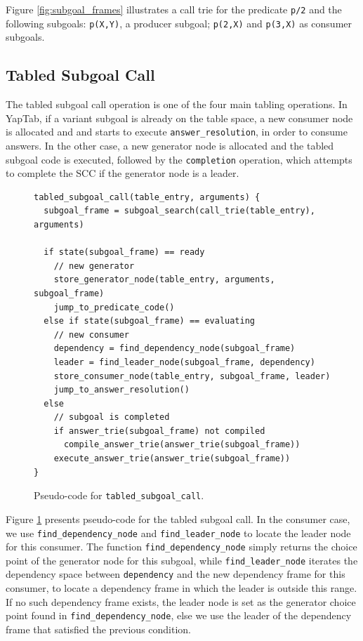 Figure \ref{fig:subgoal_frames} illustrates a call trie for the predicate \texttt{p/2}
and the following subgoals: \texttt{p(X,Y)}, a producer subgoal; \texttt{p(2,X)} and
\texttt{p(3,X)} as consumer subgoals. 

\subsection{Tabled Subgoal Call}

The tabled subgoal call operation is one of the four main tabling operations. In YapTab,
if a variant subgoal is already on the table space, a new consumer node is allocated and
and starts to execute \texttt{answer\_resolution}, in order to consume answers. In
the other case, a new generator node is allocated and the tabled subgoal code is executed,
followed by the \texttt{completion} operation, which attempts to complete the SCC if the
generator node is a leader.

\begin{figure}[ht]
\begin{Verbatim}
tabled_subgoal_call(table_entry, arguments) {
  subgoal_frame = subgoal_search(call_trie(table_entry), arguments)
  
  if state(subgoal_frame) == ready
    // new generator
    store_generator_node(table_entry, arguments, subgoal_frame)
    jump_to_predicate_code()
  else if state(subgoal_frame) == evaluating
    // new consumer
    dependency = find_dependency_node(subgoal_frame)
    leader = find_leader_node(subgoal_frame, dependency)
    store_consumer_node(table_entry, subgoal_frame, leader)
    jump_to_answer_resolution()
  else
    // subgoal is completed
    if answer_trie(subgoal_frame) not compiled
      compile_answer_trie(answer_trie(subgoal_frame))
    execute_answer_trie(answer_trie(subgoal_frame))
}
\end{Verbatim}
\caption{Pseudo-code for \texttt{tabled\_subgoal\_call}.}
\label{fig:tabled_subgoal_call}
\end{figure}

Figure \ref{fig:tabled_subgoal_call} presents pseudo-code for the tabled subgoal call.
In the consumer case, we use \texttt{find\_dependency\_node} and \texttt{find\_leader\_node}
to locate the leader node for this consumer. The function \texttt{find\_dependency\_node} simply
returns the choice point of the generator node for this subgoal, while \texttt{find\_leader\_node}
iterates the dependency space between \texttt{dependency} and the new dependency frame for this consumer,
to locate a dependency frame in which the leader is outside this range. If no such dependency frame
exists, the leader node is set as the generator choice point found in \texttt{find\_dependency\_node},
else we use the leader of the dependency frame that satisfied the previous condition. 

